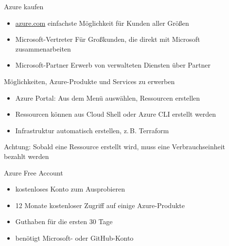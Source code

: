
\begin{flashcard}[\ ]{Azure kaufen}
    \begin{itemize}
        \item \href{azure.com}{azure.com}\newline
            einfachste Möglichkeit für Kunden aller Größen
        \item Microsoft-Vertreter\newline
            Für Großkunden, die direkt mit Microsoft zusammenarbeiten
        \item Microsoft-Partner\newline
            Erwerb von verwalteten Diensten über Partner
    \end{itemize}
\end{flashcard}

\begin{flashcard}[\ ]{Möglichkeiten, Azure-Produkte und Services zu erwerben}
    \begin{itemize}
        \item Azure Portal: Aus dem Menü auswählen, Ressourcen erstellen
        \item Ressourcen können aus Cloud Shell oder Azure CLI erstellt werden
        \item Infrastruktur automatisch erstellen, z.\,B. Terraform
    \end{itemize}

    \vspace{5mm}
    Achtung: Sobald eine Ressource erstellt wird, muss eine Verbrauchseinheit bezahlt werden
\end{flashcard}

\begin{flashcard}[\ ]{Azure Free Account}
    \begin{itemize}
        \item kostenloses Konto zum Ausprobieren
        \item 12 Monate kostenloser Zugriff auf einige Azure-Produkte
        \item Guthaben für die ersten 30 Tage
        \item benötigt Microsoft- oder GitHub-Konto
    \end{itemize}

\end{flashcard}

